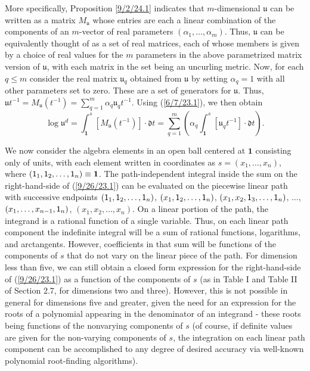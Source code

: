 \documentclass{amsart}
\numberwithin{equation}{section}
\theoremstyle{definition}
\numberwithin{theorem}{section}
\begin{document}
More specifically, Proposition \ref{9/2/24.1} indicates that $m$-dimensional $\mathfrak{u}$ can be written as a matrix $M_\mathfrak{u}$ whose entries are each a linear combination of the components of an $m$-vector of real parameters $(\alpha_1, \dots, \alpha_m)$.   Thus, $\mathfrak{u}$ can be equivalently thought of as a set of real matrices, each of whose members is given by a choice of real values for the $m$ parameters in the above parametrized matrix version of $\mathfrak{u}$, with each matrix in the set being an uncurling metric.  Now, for each $q\le m$ consider the real matrix  $\mathfrak{u}_q$ obtained from $\mathfrak{u}$ by setting $\alpha_q =1$ with all other parameters set to zero.  These are a set of generators for $\mathfrak{u}$. Thus, $\mathfrak{u}t^{-1} = M_{\mathfrak{u}}(t^{-1}) = \sum_{q=1}^m \alpha_q \mathfrak{u}_q t^{-1}$.   Using (\ref{6/7/23.1}), we then obtain \begin{equation}\label{9/26/23.1} \log  \mathfrak{u}^d = \int_{\mathbf{1}}^s [M_{\mathfrak{u}} (t^{-1})]\cdot \mathfrak{d}t =\sum_{q=1}^m \left(\alpha_q \int_{\mathbf{1}}^s [\mathfrak{u}_q t^{-1}]\cdot \mathfrak{d}t\right).\end{equation}  

We now consider the algebra elements in an open ball centered at $\mathbf{1}$ consisting only of units, with each element written in coordinates as $s = (x_1,\dots,x_n)$, where $({\sf 1}_1,{\sf 1}_2,\dots,{\sf 1}_n) \equiv \mathbf{1}$.  The path-independent integral inside the sum on the right-hand-side of (\ref{9/26/23.1}) can be evaluated on the piecewise linear path with successive endpoints $({\sf 1}_1,{\sf 1}_2,\dots,{\sf 1}_n)$, $(x_1,{\sf 1}_2,\dots,{\sf 1}_n)$, $(x_1,x_2,{\sf 1}_3,\dots,{\sf 1}_n)$,  $\dots$, $(x_1,\dots, x_{n-1}, {\sf 1}_n)$, $(x_1,x_2,\dots,x_n)$.    On a linear portion of the path, the integrand is a rational function of a single variable.  Thus, on each linear path component the indefinite integral will be a sum of rational functions, logarithms, and arctangents.  However, coefficients in that sum will be functions of the components of $s$ that do not vary on the linear piece of the path.  For dimension less than five, we can still obtain a closed form expression for the right-hand-side of (\ref{9/26/23.1}) as a function of the components of $s$ (as in Table I and Table II of Section 2.7, for dimensions two and three).  However, this is not possible in general for dimensions five and greater, given the need for an expression for the roots of a polynomial appearing in the denominator of an integrand - these roots being functions of the nonvarying components of $s$ (of course, if definite values are given for the non-varying components of $s$, the integration on each linear path component can be accomplished to any degree of desired accuracy via well-known polynomial root-finding algorithms).
\end{document}
